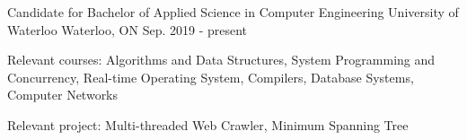 

\begin{cventries}

  \cventry
    {Candidate for Bachelor of Applied Science in Computer Engineering} %
    {University of Waterloo} %
    {Waterloo, ON} %
    {Sep. 2019 - present} %
    {
      \begin{cvitems} %
        \item {Relevant courses: Algorithms and Data Structures, System Programming and Concurrency, Real-time Operating System, Compilers, Database Systems, Computer Networks}
        \item {
        	Relevant project: Multi-threaded Web Crawler, Minimum Spanning Tree
        }
      \end{cvitems}
    }

\end{cventries}
